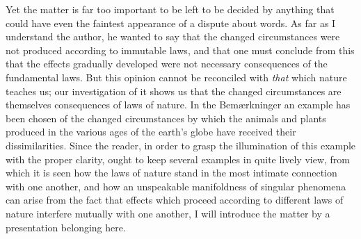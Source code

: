 \documentclass[12pt,a4paper,openany]{book}
\newcommand{\opage}[1]{\marginnote{\footnotesize\textit{[#1]}}}
\begin{document}
\setcounter{footnote}{0}%
\opage{69}Yet the matter is far too important to be left to be decided by anything that
could have even the faintest appearance of a dispute about words. As far as I
understand the author, he wanted to say that the changed circumstances were not
produced according to immutable laws, and that one must conclude from this that the
effects gradually developed were not necessary consequences of the fundamental laws.
But this opinion cannot be reconciled with \emph{that} which nature teaches us; our
investigation of it shows us that the changed circumstances are themselves
consequences of laws of nature. In the Bemærkninger an example has been chosen of
the changed circumstances by which the animals and plants produced in the various
ages of the earth's globe have received their dissimilarities. Since the reader, in
order to grasp the illumination of this example with the proper clarity, ought to
keep several examples in quite lively view, from which it is seen how the laws of
nature stand in the most intimate connection with one another, and how an
unspeakable manifoldness of singular phenomena can arise from the fact that effects
which proceed according to different laws of nature interfere mutually with one
another, I will introduce the matter by a presentation belonging here.
\end{document}
